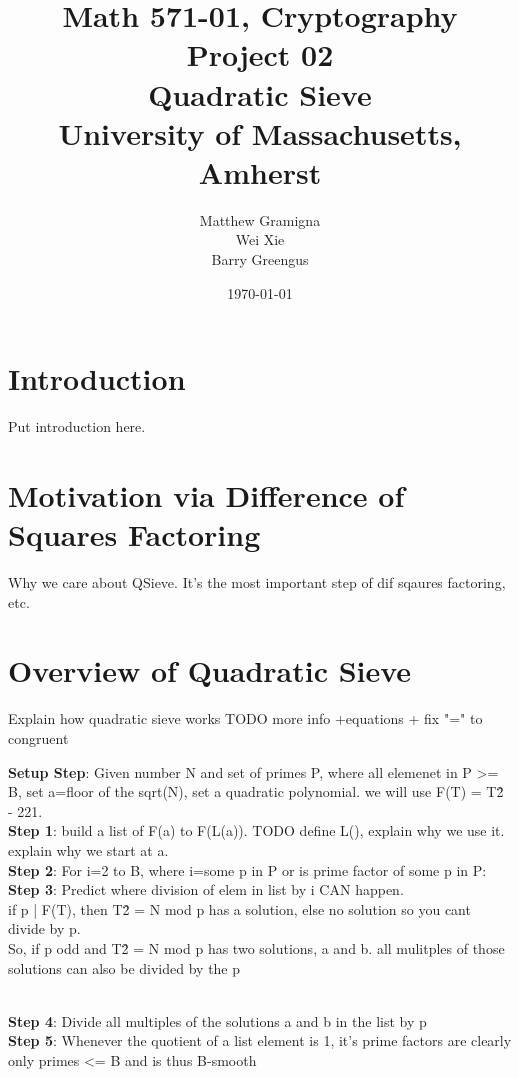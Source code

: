\documentclass[titlepage]{article}
\title{Math 571-01, Cryptography Project 02 \\ Quadratic Sieve \\ University of Massachusetts, Amherst}
\author{Matthew Gramigna \\ Wei Xie \\ Barry Greengus}
\date{\today}
\begin{document}
	
	\maketitle
	
	\section{Introduction}
	Put introduction here.
	
	\section{Motivation via Difference of Squares Factoring}
	Why we care about QSieve. It's the most important step of dif sqaures factoring, etc.

	\section{Overview of Quadratic Sieve}
	Explain how quadratic sieve works TODO more info +equations + fix "=" to congruent

		\noindent\textbf{Setup Step}: Given number N and set of primes P, where all elemenet in P >= B, set a=floor of the sqrt(N), set a quadratic polynomial. we will use F(T) = T\^2 - 221.\\

		\noindent\textbf{Step 1}: build a list of F(a) to F(L(a)). TODO define L(), explain why we use it. explain why we start at a.\\

		\noindent\textbf{Step 2}: For i=2 to B, where i=some p in P or is prime factor of some p in P:\\
	
		\noindent\textbf{Step 3}: Predict where division of elem in list by i CAN happen.\\
		if p | F(T), then T\^2 = N mod p has a solution, else no solution so you cant divide by p.\\
		So, if p odd  and T\^2 = N mod p has two solutions, a and b. all mulitples of those solutions can also be divided by the p\\\

		\noindent\textbf{Step 4}: Divide all multiples of the solutions a and b in the list by p\\

		\noindent\textbf{Step 5}: Whenever the quotient of a list element is 1,  it's prime factors are clearly only primes <= B and is thus B-smooth\\ 
	  
\end{document}
